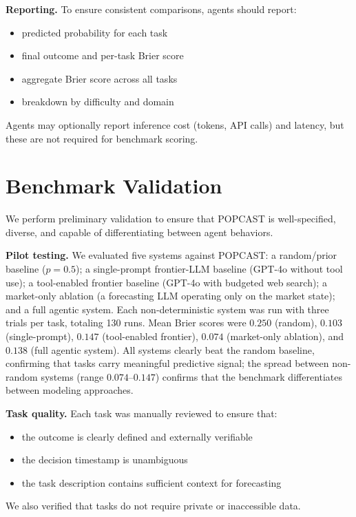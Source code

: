 \documentclass{article} %
\newcommand{\benchmarkname}{POPCAST}
\begin{document}
\textbf{Reporting.} To ensure consistent comparisons, agents should report:
\begin{itemize}[noitemsep]
    \item predicted probability for each task
    \item final outcome and per-task Brier score
    \item aggregate Brier score across all tasks
    \item breakdown by difficulty and domain
\end{itemize}

Agents may optionally report inference cost (tokens, API calls) and latency, but these are not required for benchmark scoring.

\section{Benchmark Validation}
\label{sec:validation}

We perform preliminary validation to ensure that \benchmarkname{} is well-specified, diverse, and capable of differentiating between agent behaviors.

\textbf{Pilot testing.} We evaluated five systems against \benchmarkname{}: a random/prior baseline ($p=0.5$); a single-prompt frontier-LLM baseline (GPT-4o without tool use); a tool-enabled frontier baseline (GPT-4o with budgeted web search); a market-only ablation (a forecasting LLM operating only on the market state); and a full agentic system. Each non-deterministic system was run with three trials per task, totaling 130 runs. Mean Brier scores were $0.250$ (random), $0.103$ (single-prompt), $0.147$ (tool-enabled frontier), $0.074$ (market-only ablation), and $0.138$ (full agentic system). All systems clearly beat the random baseline, confirming that tasks carry meaningful predictive signal; the spread between non-random systems (range $0.074$--$0.147$) confirms that the benchmark differentiates between modeling approaches.

\textbf{Task quality.} Each task was manually reviewed to ensure that:
\begin{itemize}[noitemsep]
    \item the outcome is clearly defined and externally verifiable
    \item the decision timestamp is unambiguous
    \item the task description contains sufficient context for forecasting
\end{itemize}
We also verified that tasks do not require private or inaccessible data.
\end{document}
